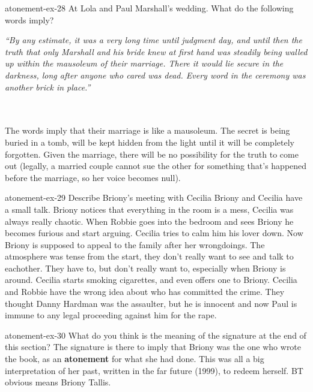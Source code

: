 \documentclass[preview]{standalone}
\begin{document}
\begin{snippetexercise}{atonement-ex-28}
    {At Lola and Paul Marshall's wedding. What do the following words imply?}
    \hspace{0.1\textwidth}
    \begin{minipage}[r]{0.8\textwidth}
        \itshape
        “By any estimate, it was a very long time until judgment day, and until then the truth that only
        Marshall and his bride knew at first hand was steadily being walled up within the mausoleum of
        their marriage. There it would lie secure in the darkness, long after anyone who cared was dead.
        Every word in the ceremony was another brick in place.” 
    \end{minipage}
    \\\\
    The words imply that their marriage is like a mausoleum.
    The secret is being buried in a tomb, will be kept hidden from the light until
    it will be completely forgotten.
    Given the marriage, there will be no possibility for the truth to come out
    (legally, a married couple cannot sue the other for something that's happened
    before the marriage, so her voice becomes null).
\end{snippetexercise}

\begin{snippetexercise}{atonement-ex-29}
    {Describe Briony's meeting with Cecilia}
    Briony and Cecilia have a small talk. Briony notices that everything in the room
    is a mess, Cecilia was always really chaotic.
    When Robbie goes into the bedroom and sees Briony he becomes furious
    and start arguing. Cecilia tries to calm him his lover down.
    Now Briony is supposed to appeal to the family after her wrongdoings.
    The atmosphere was tense from the start, they don't really want to see and talk to eachother.
    They have to, but don't really want to, especially when Briony is around.
    Cecilia starts smoking cigarettes, and even offers one to Briony.
    Cecilia and Robbie have the wrong idea about who has committed the crime.
    They thought Danny Hardman was the assaulter, but he is innocent and now
    Paul is immune to any legal proceeding against him for the rape.
\end{snippetexercise}

\begin{snippetexercise}{atonement-ex-30}
    {What do you think is the meaning of the signature at the end of this section?}
    The signature is there to imply that Briony was the one who wrote the book,
    as an \textbf{atonement} for what she had done.
    This was all a big interpretation of her past,
    written in the far future (1999),
    to redeem herself.
    BT obvious means Briony Tallis.
\end{snippetexercise}
\end{document}
